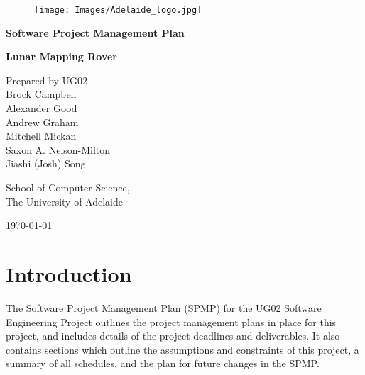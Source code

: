 \documentclass{article}
\begin{document}
\begin{titlepage}
	\centering
    \begin{figure}[h!]
    	\centering
    	\texttt{[image: Images/Adelaide\_logo.jpg]}
    \end{figure}
    
    {\bfseries \huge Software Project Management Plan \par}
    \vspace{.5cm} 
    {\bfseries\huge Lunar Mapping Rover \par}
    \vspace{4cm}
	{{\Large Prepared by UG02} 
    \vspace{.25cm} 
    \\ {\large Brock Campbell 
    \\ Alexander Good
    \\ Andrew Graham
    \\ Mitchell Mickan 
    \\ Saxon A. Nelson-Milton
    \\ Jiashi (Josh) Song} \par}
    \vspace{1cm}
	{\large School of Computer Science, \\ The University of Adelaide \par}
    \vspace{1cm}
	{\large \today \par}
\end{titlepage}

\tableofcontents
\newpage
\section{Introduction}
The Software Project Management Plan (SPMP) for the UG02 Software Engineering Project outlines the project management plans in place for this project, and includes details of the project deadlines and deliverables. It also contains sections which outline the assumptions and constraints of this project, a summary of all schedules, and the plan for future changes in the SPMP.

\end{document}
